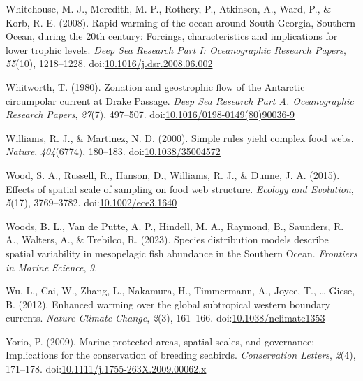 \documentclass[
]{article}
\newlength{\cslhangindent}
\newenvironment{CSLReferences}[2] %
 {\begin{list}{}{%
  \setlength{\itemindent}{0pt}
  \setlength{\leftmargin}{0pt}
  \setlength{\parsep}{0pt}
  \ifodd #1
   \setlength{\leftmargin}{\cslhangindent}
   \setlength{\itemindent}{-1\cslhangindent}
  \fi
  \setlength{\itemsep}{#2\baselineskip}}}
 {\end{list}}
\begin{document}
\begin{CSLReferences}{1}{0}
Whitehouse, M. J., Meredith, M. P., Rothery, P., Atkinson, A., Ward, P.,
\& Korb, R. E. (2008). Rapid warming of the ocean around {South
Georgia}, {Southern Ocean}, during the 20th century: {Forcings},
characteristics and implications for lower trophic levels. \emph{Deep
Sea Research Part I: Oceanographic Research Papers}, \emph{55}(10),
1218--1228.
doi:\href{https://doi.org/10.1016/j.dsr.2008.06.002}{10.1016/j.dsr.2008.06.002}

Whitworth, T. (1980). Zonation and geostrophic flow of the {Antarctic}
circumpolar current at {Drake Passage}. \emph{Deep Sea Research Part A.
Oceanographic Research Papers}, \emph{27}(7), 497--507.
doi:\href{https://doi.org/10.1016/0198-0149(80)90036-9}{10.1016/0198-0149(80)90036-9}

Williams, R. J., \& Martinez, N. D. (2000). Simple rules yield complex
food webs. \emph{Nature}, \emph{404}(6774), 180--183.
doi:\href{https://doi.org/10.1038/35004572}{10.1038/35004572}

Wood, S. A., Russell, R., Hanson, D., Williams, R. J., \& Dunne, J. A.
(2015). Effects of spatial scale of sampling on food web structure.
\emph{Ecology and Evolution}, \emph{5}(17), 3769--3782.
doi:\href{https://doi.org/10.1002/ece3.1640}{10.1002/ece3.1640}

Woods, B. L., Van de Putte, A. P., Hindell, M. A., Raymond, B.,
Saunders, R. A., Walters, A., \& Trebilco, R. (2023). Species
distribution models describe spatial variability in mesopelagic fish
abundance in the {Southern Ocean}. \emph{Frontiers in Marine Science},
\emph{9}.

Wu, L., Cai, W., Zhang, L., Nakamura, H., Timmermann, A., Joyce, T.,
\ldots{} Giese, B. (2012). Enhanced warming over the global subtropical
western boundary currents. \emph{Nature Climate Change}, \emph{2}(3),
161--166.
doi:\href{https://doi.org/10.1038/nclimate1353}{10.1038/nclimate1353}

Yorio, P. (2009). Marine protected areas, spatial scales, and
governance: Implications for the conservation of breeding seabirds.
\emph{Conservation Letters}, \emph{2}(4), 171--178.
doi:\href{https://doi.org/10.1111/j.1755-263X.2009.00062.x}{10.1111/j.1755-263X.2009.00062.x}

\end{CSLReferences}
\end{document}
